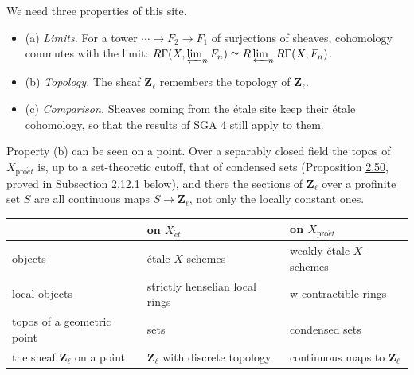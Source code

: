 \documentclass[11pt]{article}
\begin{document}
We need three properties of this site.

\begin{itemize}
\item (a) \emph{Limits.} For a tower \(\cdots\to F_2\to F_1\) of surjections of sheaves, cohomology commutes with the limit: \(R\Gamma(X,\varprojlim_nF_n)\simeq R\varprojlim_nR\Gamma(X,F_n)\).
\item (b) \emph{Topology.} The sheaf \(\mathbf Z_\ell\) remembers the topology of \(\mathbf Z_\ell\).
\item (c) \emph{Comparison.} Sheaves coming from the étale site keep their étale cohomology, so that the results of SGA 4 still apply to them.
\end{itemize}

Property (b) can be seen on a point. Over a separably closed field the topos of \(X_{\mathrm{pro}\acute{e}t}\) is, up to a set-theoretic cutoff, that of condensed sets (Proposition \hyperref[bp153]{2.50}, proved in Subsection \hyperref[bp151]{2.12.1} below), and there the sections of \(\mathbf Z_\ell\) over a profinite set \(S\) are all continuous maps \(S\to\mathbf Z_\ell\), not only the locally constant ones.

\begin{center}\small
\begin{tabularx}{\linewidth}{>{\raggedright\arraybackslash}X>{\raggedright\arraybackslash}X>{\raggedright\arraybackslash}X}
\toprule
 & on \(X_{\acute{e}t}\) & on \(X_{\mathrm{pro}\acute{e}t}\) \\
\midrule
objects & étale \(X\)-schemes & weakly étale \(X\)-schemes \\
local objects & strictly henselian local rings & w-contractible rings \\
topos of a geometric point & sets & condensed sets \\
the sheaf \(\mathbf Z_\ell\) on a point & \(\mathbf Z_\ell\) with discrete topology & continuous maps to \(\mathbf Z_\ell\) \\
\bottomrule
\end{tabularx}
\end{center}
\end{document}
